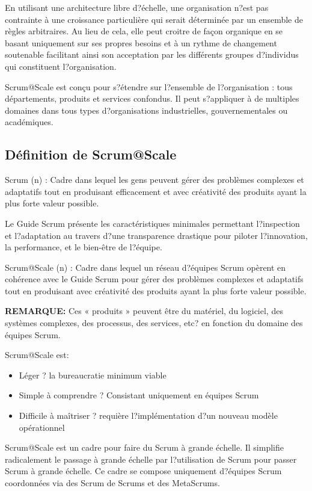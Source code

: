 \documentclass[12pt,a4paper,parskip=full]{scrartcl}
\begin{document}
En utilisant une architecture libre d?échelle, une organisation n?est pas contrainte à une
croissance particulière qui serait déterminée par un ensemble de règles arbitraires. Au lieu
de cela, elle peut croitre de façon organique en se basant uniquement sur ses propres
besoins et à un rythme de changement soutenable facilitant ainsi son acceptation par les
différents groupes d?individus qui constituent l?organisation.

Scrum@Scale est conçu pour s?étendre sur l?ensemble de l?organisation : tous
départements, produits et services confondus. Il peut s?appliquer à de multiples domaines
dans tous types d?organisations industrielles, gouvernementales ou académiques.

\subsection{Définition de Scrum@Scale}
Scrum (n) : Cadre dans lequel les gens peuvent gérer des problèmes complexes et
adaptatifs tout en produisant efficacement et avec créativité des produits ayant la plus
forte valeur possible.

Le Guide Scrum présente les caractéristiques minimales permettant l?inspection et
l?adaptation au travers d?une transparence drastique pour piloter l?innovation, la
performance, et le bien-être de l?équipe.

Scrum@Scale (n) : Cadre dans lequel un réseau d?équipes Scrum opèrent en cohérence
avec le Guide Scrum pour gérer des problèmes complexes et adaptatifs tout en produisant
avec créativité des produits ayant la plus forte valeur possible.

\textbf{REMARQUE:} Ces « produits » peuvent être du matériel, du logiciel, des systèmes
complexes, des processus, des services, etc? en fonction du domaine des équipes
Scrum.

Scrum@Scale est:
\begin{itemize}
\item Léger ? la bureaucratie minimum viable
\item Simple à comprendre ? Consistant uniquement en équipes Scrum
\item Difficile à maîtriser ? requière l?implémentation d?un nouveau modèle opérationnel
\end{itemize}


Scrum@Scale est un cadre pour faire du Scrum à grande échelle. Il simplifie radicalement
le passage à grande échelle par l?utilisation de Scrum pour passer Scrum à grande
échelle. Ce cadre se compose uniquement d?équipes Scrum coordonnées via des Scrum
de Scrums et des MetaScrums.
\end{document}
